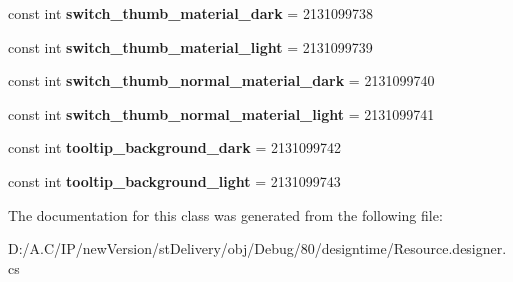 \begin{DoxyCompactItemize}
const int {\bfseries switch\+\_\+thumb\+\_\+material\+\_\+dark} = 2131099738
\item 
\mbox{\label{classst_delivery_1_1_resource_1_1_color_a70175484401dfcd2f4a1aa76576d0e3f}} 
const int {\bfseries switch\+\_\+thumb\+\_\+material\+\_\+light} = 2131099739
\item 
\mbox{\label{classst_delivery_1_1_resource_1_1_color_ab19bc36da37fcf05d3b3a36012bc3a07}} 
const int {\bfseries switch\+\_\+thumb\+\_\+normal\+\_\+material\+\_\+dark} = 2131099740
\item 
\mbox{\label{classst_delivery_1_1_resource_1_1_color_aecfdea4660f8f244111dd2864bf487d2}} 
const int {\bfseries switch\+\_\+thumb\+\_\+normal\+\_\+material\+\_\+light} = 2131099741
\item 
\mbox{\label{classst_delivery_1_1_resource_1_1_color_abea67ee57bda6e5d842fd985364dfa7a}} 
const int {\bfseries tooltip\+\_\+background\+\_\+dark} = 2131099742
\item 
\mbox{\label{classst_delivery_1_1_resource_1_1_color_af927211dfc15377f02733d7a1ffe56da}} 
const int {\bfseries tooltip\+\_\+background\+\_\+light} = 2131099743
\end{DoxyCompactItemize}


The documentation for this class was generated from the following file\+:\begin{DoxyCompactItemize}
\item 
D\+:/\+A.\+C/\+I\+P/new\+Version/st\+Delivery/obj/\+Debug/80/designtime/Resource.\+designer.\+cs\end{DoxyCompactItemize}
